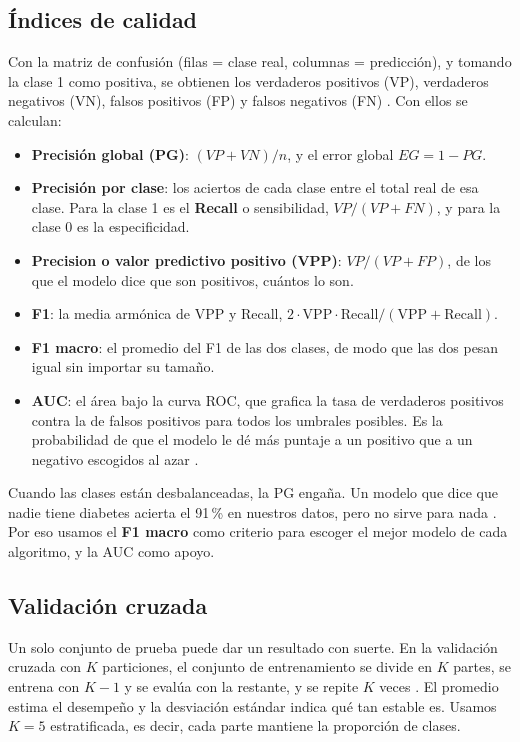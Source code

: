 \documentclass[11pt,a4paper]{article}
\let\citepOriginal\citep
\renewcommand*{\citep}[1]{\textbf{\citepOriginal{#1}}}%
\begin{document}
\subsection{Índices de calidad}
Con la matriz de confusión (filas = clase real, columnas = predicción), y tomando la clase 1 como positiva, se obtienen los verdaderos positivos (VP), verdaderos negativos (VN), falsos positivos (FP) y falsos negativos (FN) \citep{sokolova2009}. Con ellos se calculan:
\begin{itemize}
  \item \textbf{Precisión global (PG)}: $(VP+VN)/n$, y el error global $EG=1-PG$.
  \item \textbf{Precisión por clase}: los aciertos de cada clase entre el total real de esa clase. Para la clase 1 es el \textbf{Recall} o sensibilidad, $VP/(VP+FN)$, y para la clase 0 es la especificidad.
  \item \textbf{Precision o valor predictivo positivo (VPP)}: $VP/(VP+FP)$, de los que el modelo dice que son positivos, cuántos lo son.
  \item \textbf{F1}: la media armónica de VPP y Recall, $2\cdot\mathrm{VPP}\cdot\mathrm{Recall}/(\mathrm{VPP}+\mathrm{Recall})$.
  \item \textbf{F1 macro}: el promedio del F1 de las dos clases, de modo que las dos pesan igual sin importar su tamaño.
  \item \textbf{AUC}: el área bajo la curva ROC, que grafica la tasa de verdaderos positivos contra la de falsos positivos para todos los umbrales posibles. Es la probabilidad de que el modelo le dé más puntaje a un positivo que a un negativo escogidos al azar \citep{fawcett2006}.
\end{itemize}
Cuando las clases están desbalanceadas, la PG engaña. Un modelo que dice que nadie tiene diabetes acierta el 91\,\% en nuestros datos, pero no sirve para nada \citep{he2009}. Por eso usamos el \textbf{F1 macro} como criterio para escoger el mejor modelo de cada algoritmo, y la AUC como apoyo.

\subsection{Validación cruzada}
Un solo conjunto de prueba puede dar un resultado con suerte. En la validación cruzada con $K$ particiones, el conjunto de entrenamiento se divide en $K$ partes, se entrena con $K-1$ y se evalúa con la restante, y se repite $K$ veces \citep{kohavi1995}. El promedio estima el desempeño y la desviación estándar indica qué tan estable es. Usamos $K=5$ estratificada, es decir, cada parte mantiene la proporción de clases.
\end{document}
